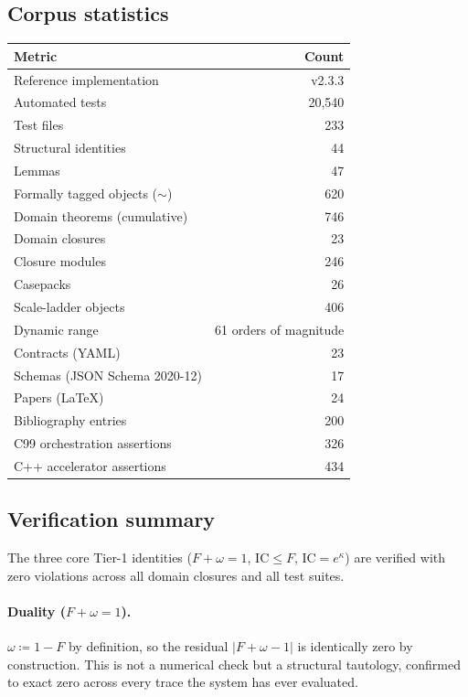 \documentclass[
  aps,
  prd,
  twocolumn,
  superscriptaddress,
  nofootinbib,
  floatfix
]{revtex4-2}
\newcommand{\IC}{\mathrm{IC}}
\begin{document}
\subsection{Corpus statistics}

\begin{center}
{\small\begin{tabular}{@{}lr@{}}
\toprule
\textbf{Metric} & \textbf{Count} \\
\midrule
Reference implementation & v2.3.3 \\
Automated tests & 20{,}540 \\
Test files & 233 \\
Structural identities & 44 \\
Lemmas & 47 \\
Formally tagged objects ($\sim$) & 620 \\
Domain theorems (cumulative) & 746 \\
Domain closures & 23 \\
Closure modules & 246 \\
Casepacks & 26 \\
Scale-ladder objects & 406 \\
Dynamic range & 61 orders of magnitude \\
Contracts (YAML) & 23 \\
Schemas (JSON Schema 2020-12) & 17 \\
Papers (LaTeX) & 24 \\
Bibliography entries & 200 \\
C99 orchestration assertions & 326 \\
C++ accelerator assertions & 434 \\
\bottomrule
\end{tabular}}
\end{center}

\subsection{Verification summary}

The three core Tier-1 identities ($F + \omega = 1$,
$\IC \leq F$, $\IC = e^\kappa$) are verified with zero violations
across all domain closures and all test suites.

\paragraph{Duality ($F + \omega = 1$).}
$\omega \coloneqq 1 - F$ by definition, so the residual
$|F + \omega - 1|$ is identically zero by construction.
This is not a numerical check but a structural tautology,
confirmed to exact zero across every trace the system has
ever evaluated.
\end{document}
